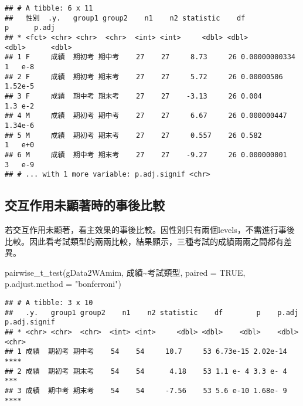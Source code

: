 \documentclass[
]{book}
\newenvironment{Shaded}{\begin{snugshade}}{\end{snugshade}}
\newcommand{\AttributeTok}[1]{\textcolor[rgb]{0.77,0.63,0.00}{#1}}
\newcommand{\ConstantTok}[1]{\textcolor[rgb]{0.00,0.00,0.00}{#1}}
\newcommand{\FunctionTok}[1]{\textcolor[rgb]{0.00,0.00,0.00}{#1}}
\newcommand{\NormalTok}[1]{#1}
\newcommand{\SpecialCharTok}[1]{\textcolor[rgb]{0.00,0.00,0.00}{#1}}
\newcommand{\StringTok}[1]{\textcolor[rgb]{0.31,0.60,0.02}{#1}}
\begin{document}
\begin{verbatim}
## # A tibble: 6 x 11
##   性別  .y.   group1 group2    n1    n2 statistic    df             p      p.adj
## * <fct> <chr> <chr>  <chr>  <int> <int>     <dbl> <dbl>         <dbl>      <dbl>
## 1 F     成績  期初考 期中考    27    27     8.73     26 0.00000000334    1   e-8
## 2 F     成績  期初考 期末考    27    27     5.72     26 0.00000506       1.52e-5
## 3 F     成績  期中考 期末考    27    27    -3.13     26 0.004            1.3 e-2
## 4 M     成績  期初考 期中考    27    27     6.67     26 0.000000447      1.34e-6
## 5 M     成績  期初考 期末考    27    27     0.557    26 0.582            1   e+0
## 6 M     成績  期中考 期末考    27    27    -9.27     26 0.000000001      3   e-9
## # ... with 1 more variable: p.adj.signif <chr>
\end{verbatim}

\hypertarget{ux4ea4ux4e92ux4f5cux7528ux672aux986fux8457ux6642ux7684ux4e8bux5f8cux6bd4ux8f03}{%
\subsection{交互作用未顯著時的事後比較}\label{ux4ea4ux4e92ux4f5cux7528ux672aux986fux8457ux6642ux7684ux4e8bux5f8cux6bd4ux8f03}}

若交互作用未顯著，看主效果的事後比較。因性別只有兩個levels，不需進行事後比較。因此看考試類型的兩兩比較，結果顯示，三種考試的成績兩兩之間都有差異。

\begin{Shaded}
\begin{Highlighting}[]
\FunctionTok{pairwise\_t\_test}\NormalTok{(gData2WAmim, 成績}\SpecialCharTok{\textasciitilde{}}\NormalTok{考試類型, }\AttributeTok{paired =} \ConstantTok{TRUE}\NormalTok{, }\AttributeTok{p.adjust.method =} \StringTok{"bonferroni"}\NormalTok{)}
\end{Highlighting}
\end{Shaded}

\begin{verbatim}
## # A tibble: 3 x 10
##   .y.   group1 group2    n1    n2 statistic    df        p    p.adj p.adj.signif
## * <chr> <chr>  <chr>  <int> <int>     <dbl> <dbl>    <dbl>    <dbl> <chr>       
## 1 成績  期初考 期中考    54    54     10.7     53 6.73e-15 2.02e-14 ****        
## 2 成績  期初考 期末考    54    54      4.18    53 1.1 e- 4 3.3 e- 4 ***         
## 3 成績  期中考 期末考    54    54     -7.56    53 5.6 e-10 1.68e- 9 ****
\end{verbatim}
\end{document}
